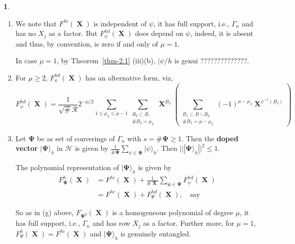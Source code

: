 \documentclass[a4paper,12pt]{article}
\DeclareMathOperator{\x}{\mathrm{X}}
\theoremstyle{definition}
\theoremstyle{underlinethm}
\theoremstyle{definition}
\newtheorem{subsubsec}{}[subsection]
\begin{document}
\begin{subsubsec}
\begin{enumerate}[label=(\alph*)]
\item We note that $F^{hi}(\boldsymbol{\x})$ is independent of $\psi$, it has full support, i.e., $\Gamma_{n}$ and has no $X_{j}$ as a factor. But $F_{\psi}^{hd}(\boldsymbol{\x})$ does depend on $\psi$, indeed, it is absent and thus, by convention, is zero if and only of $\mu=1$.

In case $\mu =1$, by Theorem~\ref{thm-2.1} (iii)(b), $| \psi/h$ is genui ??????????????.

\item For $\mu \geq 2$, $F_{\psi}^{hd}(\boldsymbol{\x})$ has an alternative form, viz, 
\begin{equation}
F_{\psi}^{hd} (\boldsymbol{\x}) = \frac{1}{ \sqrt{\#} \mathcal{R}} 2^{-\mu/2} \sum_{1 \leq \mu_{2} \leq \mu-1} \sum_{\substack{B_{2} \subset B,\\
\# B_{2} = \mu_{2}}} \boldsymbol{\x}^{B_{2}} \left(\sum_{\substack{B_{1} \subset B \smallsetminus B_{2} \\ \# B_{1} = \mu-\mu_{2}}} (-1)^{\mu-\mu_{2}} \boldsymbol{\x}^{\psi^{-1} (B_{1})}\right)\tag{3.76}\label{eq-3.76}
\end{equation}

\item Let $\boldsymbol{\Psi}$ be as set of converings of $\Gamma_{n}$ with $s=\# \boldsymbol{\Psi} \geq 1$. Then the \textbf{doped vector} $| \boldsymbol{\Psi} \rangle_{h}$ in $\mathcal{H}$ is given by $\frac{1}{\# \boldsymbol{\Psi}} \sum_{\psi \in \boldsymbol{\Psi}} | \psi \rangle_{h}$. Then $|| | \boldsymbol{\Psi} \rangle_{h}||^{2} \leq 1$.

The polynomial representation of $| \boldsymbol{\Psi}\rangle_{h}$ is given by
\begin{align*}
F_{\boldsymbol{\Psi}}^{h}(\boldsymbol{\x}) &= F^{hi}(\boldsymbol{\x}) + \frac{1}{\# \boldsymbol{\x}} \sum_{\boldsymbol{\psi \in \boldsymbol{\Psi}}} F_{\psi}^{hd}(\boldsymbol{\x})\\
& = F^{hc}(\boldsymbol{\x}) + F_{\Psi}^{hd} (\boldsymbol{\x}),\quad \text{say}\tag{3.77}\label{eq-3.77}
\end{align*} 

So as in (g) above, $F_{\boldsymbol{\Psi}^{g}}(\boldsymbol{\x})$ is a homogeneous polynomial of degree $\mu$, it has full support, i.e., $\Gamma_{n}$ and has row $X_{j}$ as a factor. Further more, for $\mu=1$, $F_{\Psi}^{h} (\boldsymbol{\x})= F^{hi}(\boldsymbol{\x})$ and $| \boldsymbol{\Psi} \rangle_{h}$ is genuinely entangled.
 

\end{enumerate}
\end{subsubsec}
\end{document}

